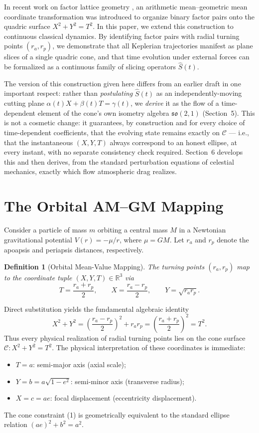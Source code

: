 \documentclass[11pt]{amsart}
\newtheorem{definition}[theorem]{Definition}
\begin{document}
In recent work on factor lattice geometry \cite{Ebert2026Table}, an arithmetic mean--geometric mean coordinate transformation was introduced to organize binary factor pairs onto the quadric surface $X^2+Y^2=T^2$. In this paper, we extend this construction to continuous classical dynamics. By identifying factor pairs with radial turning points $(r_a,r_p)$, we demonstrate that all Keplerian trajectories manifest as plane slices of a single quadric cone, and that time evolution under external forces can be formalized as a continuous family of slicing operators $\hat S(t)$.

The version of this construction given here differs from an earlier draft in one important respect: rather than \emph{postulating} $\hat S(t)$ as an independently-moving cutting plane $\alpha(t)X+\beta(t)T=\gamma(t)$, we \emph{derive} it as the flow of a time-dependent element of the cone's own isometry algebra $\mathfrak{so}(2,1)$ (Section~5). This is not a cosmetic change: it guarantees, by construction and for every choice of time-dependent coefficients, that the evolving state remains exactly on $\mathcal C$ --- i.e., that the instantaneous $(X,Y,T)$ always correspond to an honest ellipse, at every instant, with no separate consistency check required. Section~6 develops this and then derives, from the standard perturbation equations of celestial mechanics, exactly which flow atmospheric drag realizes.

\section{The Orbital AM--GM Mapping}

Consider a particle of mass $m$ orbiting a central mass $M$ in a Newtonian gravitational potential $V(r)=-\mu/r$, where $\mu=GM$. Let $r_a$ and $r_p$ denote the apoapsis and periapsis distances, respectively.

\begin{definition}[Orbital Mean-Value Mapping]
The turning points $(r_a,r_p)$ map to the coordinate tuple $(X,Y,T)\in\mathbb R^3$ via
\[
T=\frac{r_a+r_p}{2},\qquad X=\frac{r_a-r_p}{2},\qquad Y=\sqrt{r_ar_p}.
\]
\end{definition}

Direct substitution yields the fundamental algebraic identity
\begin{equation}
X^2+Y^2=\left(\frac{r_a-r_p}{2}\right)^2+r_ar_p=\left(\frac{r_a+r_p}{2}\right)^2=T^2. \tag{1}
\end{equation}
Thus every physical realization of radial turning points lies on the cone surface $\mathcal C: X^2+Y^2=T^2$. The physical interpretation of these coordinates is immediate:
\begin{itemize}
\item $T=a$: semi-major axis (axial scale);
\item $Y=b=a\sqrt{1-e^2}$: semi-minor axis (transverse radius);
\item $X=c=ae$: focal displacement (eccentricity displacement).
\end{itemize}
The cone constraint (1) is geometrically equivalent to the standard ellipse relation $(ae)^2+b^2=a^2$.
\end{document}
